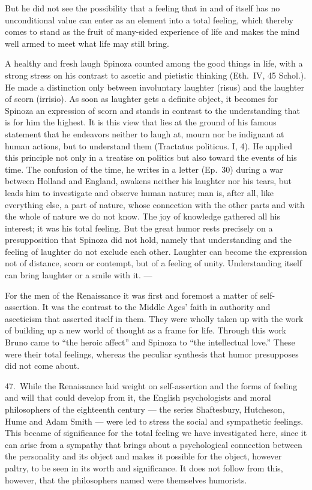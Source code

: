 \documentclass[12pt]{book}
\newcommand{\opage}[1]{\marginnote{\footnotesize\textit{[#1]}}}
\begin{document}
But he did not see the possibility that a feeling that in and of itself has no unconditional value
can enter as an element into a total feeling, which thereby comes to stand as the fruit of
many-sided experience of life and makes the mind well armed to meet what life may still bring.

A healthy and fresh laugh Spinoza counted among the good things in life, with a strong stress on
his contrast to ascetic and pietistic thinking (Eth.\ IV, 45 Schol.). He made a distinction only
between involuntary laughter (risus) and the laughter of scorn (irrisio). As soon as laughter gets a
definite object, it becomes for Spinoza an expression of scorn and stands in contrast to the
understanding that is for him the highest. It is this view that lies at the ground of his famous
statement that he endeavors neither to laugh at, mourn nor be indignant at human actions, but to
understand them (Tractatus politicus. I, 4). He applied this \opage{157}principle not only in a
treatise on politics but also toward the events of his time. The confusion of the time, he writes
in a letter (Ep.~30) during a war between Holland and England, awakens neither his laughter nor his
tears, but leads him to investigate and observe human nature; man is, after all, like everything
else, a part of nature, whose connection with the other parts and with the whole of nature we do not
know. The joy of knowledge gathered all his interest; it was his total feeling. But the great humor
rests precisely on a presupposition that Spinoza did not hold, namely that understanding and the
feeling of laughter do not exclude each other. Laughter can become the expression not of distance,
scorn or contempt, but of a feeling of unity. Understanding itself can bring laughter or a smile
with it. ---

For the men of the Renaissance it was first and foremost a matter of self-assertion. It was the
contrast to the Middle Ages' faith in authority and asceticism that asserted itself in them. They
were wholly taken up with the work of building up a new world of thought as a frame for life.
Through this work Bruno came to ``the heroic affect'' and Spinoza to ``the intellectual love.''
These were their total feelings, whereas the peculiar synthesis that humor presupposes did not come
about.

47.~While the Renaissance laid weight on self-assertion and the forms of feeling and will that could
develop from it, the English psychologists and moral philosophers of the eighteenth century --- the
series Shaftesbury, Hutcheson, Hume and Adam Smith --- were led to stress the social and sympathetic
feelings. This became of significance for the total feeling we have investigated here, since it can
arise from a sympathy that brings about a psychological connection between the personality and its
object and makes it possible for the object, however paltry, to be seen in its worth and
significance. It does not follow from this, however, that the philosophers named were themselves
humorists.
\end{document}
